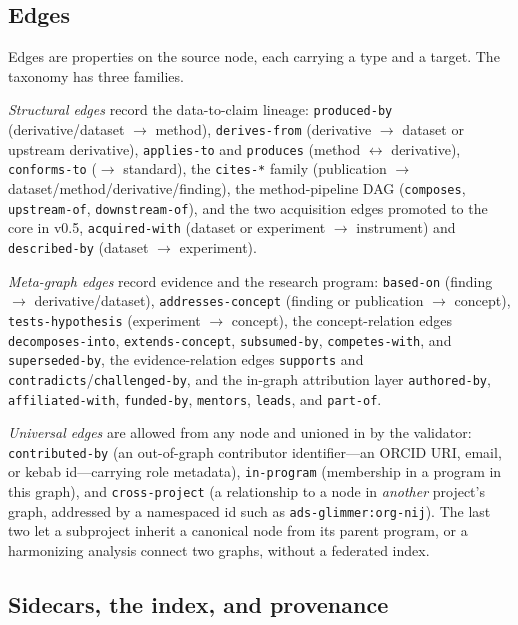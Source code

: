 \documentclass[preprint]{glimmer-paper}
\newcommand{\code}[1]{\texttt{#1}}
\begin{document}
\subsection{Edges}

Edges are properties on the source node, each carrying a type and a target. The taxonomy
has three families.

\emph{Structural edges} record the data-to-claim lineage: \code{produced-by}
(derivative/dataset $\rightarrow$ method), \code{derives-from} (derivative $\rightarrow$
dataset or upstream derivative), \code{applies-to} and \code{produces} (method
$\leftrightarrow$ derivative), \code{conforms-to} (\textrm{$\rightarrow$} standard), the
\code{cites-*} family (publication $\rightarrow$ dataset/method/derivative/finding), the
method-pipeline DAG (\code{composes}, \code{upstream-of}, \code{downstream-of}), and the
two acquisition edges promoted to the core in v0.5, \code{acquired-with} (dataset or
experiment $\rightarrow$ instrument) and \code{described-by} (dataset $\rightarrow$
experiment).

\emph{Meta-graph edges} record evidence and the research program: \code{based-on}
(finding $\rightarrow$ derivative/dataset), \code{addresses-concept} (finding or
publication $\rightarrow$ concept), \code{tests-hypothesis} (experiment $\rightarrow$
concept), the concept-relation edges \code{decomposes-into}, \code{extends-concept},
\code{subsumed-by}, \code{competes-with}, and \code{superseded-by}, the evidence-relation
edges \code{supports} and \code{contradicts}/\code{challenged-by}, and the in-graph
attribution layer \code{authored-by}, \code{affiliated-with}, \code{funded-by},
\code{mentors}, \code{leads}, and \code{part-of}.

\emph{Universal edges} are allowed from any node and unioned in by the validator:
\code{contributed-by} (an out-of-graph contributor identifier---an ORCID URI, email, or
kebab id---carrying role metadata), \code{in-program} (membership in a program in this
graph), and \code{cross-project} (a relationship to a node in \emph{another} project's
graph, addressed by a namespaced id such as \code{ads-glimmer:org-nij}). The last two let
a subproject inherit a canonical node from its parent program, or a harmonizing analysis
connect two graphs, without a federated index.

\subsection{Sidecars, the index, and provenance}
\end{document}
